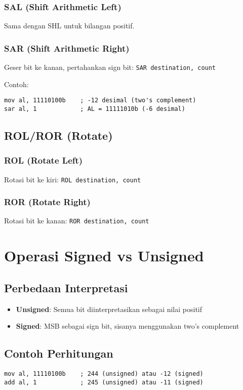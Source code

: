 \subsubsection{SAL (Shift Arithmetic Left)}
Sama dengan SHL untuk bilangan positif.

\subsubsection{SAR (Shift Arithmetic Right)}
Geser bit ke kanan, pertahankan sign bit: \texttt{SAR destination, count}

Contoh:
\begin{verbatim}
mov al, 11110100b    ; -12 desimal (two's complement)
sar al, 1            ; AL = 11111010b (-6 desimal)
\end{verbatim}

\subsection{ROL/ROR (Rotate)}
\subsubsection{ROL (Rotate Left)}
Rotasi bit ke kiri: \texttt{ROL destination, count}

\subsubsection{ROR (Rotate Right)}
Rotasi bit ke kanan: \texttt{ROR destination, count}

\section{Operasi Signed vs Unsigned}\label{sec:instruksi-dasar-signed}
\subsection{Perbedaan Interpretasi}
\begin{itemize}
    \item \textbf{Unsigned}: Semua bit diinterpretasikan sebagai nilai positif
    \item \textbf{Signed}: MSB sebagai sign bit, sisanya menggunakan two's complement
\end{itemize}

\subsection{Contoh Perhitungan}
\begin{verbatim}
mov al, 11110100b    ; 244 (unsigned) atau -12 (signed)
add al, 1            ; 245 (unsigned) atau -11 (signed)
\end{verbatim}

